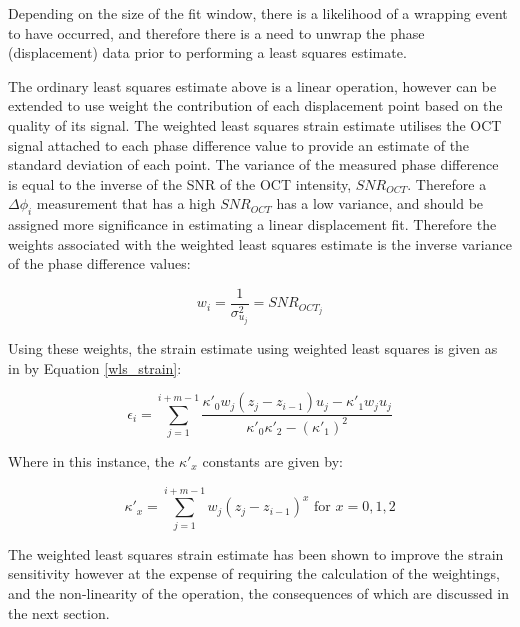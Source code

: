 Depending on the size of the fit window, there is a likelihood of a wrapping event to have occurred, and therefore there is a need to unwrap the phase (displacement) data prior to performing a least squares estimate. 

The ordinary least squares estimate above is a linear operation, however can be extended to use weight the contribution of each displacement point based on the quality of its signal. The weighted least squares strain estimate utilises the OCT signal attached to each phase difference value to provide an estimate of the standard deviation of each point. The variance of the measured phase difference is equal to the inverse of the SNR of the OCT intensity, $SNR_{OCT}$. Therefore a $\Delta \phi_i$ measurement that has a high $SNR_{OCT}$ has a low variance, and should be assigned more significance in estimating a linear displacement fit. Therefore the weights associated with the weighted least squares estimate is the inverse variance of the phase difference values:

\begin{equation}
	\label{wls_w}
	w_i = \frac{1}{\sigma_{u_j}^2} = SNR_{OCT_j}
\end{equation}

Using these weights, the strain estimate using weighted least squares is given as in \cite{kennedy_strain_2012} by Equation \ref{wls_strain}:

\begin{equation}
	\label{wls_strain}
	\epsilon_i = \sum \limits_{j=1}^{i+m-1} \frac{\kappa'_0 w_j (z_j - z_{i-1}) u_j - \kappa'_1 w_	j u_j}{\kappa'_0 \kappa'_2 - (\kappa'_1)^2}
\end{equation}

Where in this instance, the $\kappa'_x$ constants are given by:

\begin{equation}
	\label{wls_k}
	\kappa'_x = \sum \limits_{j=1}^{i+m-1} w_j (z_j - z_{i-1})^x \text{   for   } x=0,1,2
\end{equation}

The weighted least squares strain estimate has been shown to improve the strain sensitivity \cite{kennedy_strain_2012} however at the expense of requiring the calculation of the weightings, and the non-linearity of the operation, the consequences of which are discussed in the next section.

